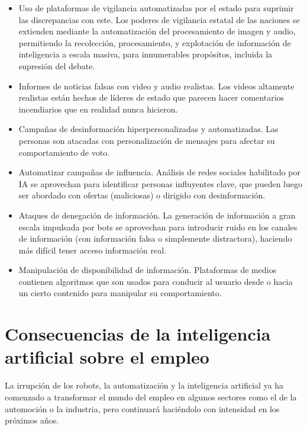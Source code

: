 \documentclass[12pt,a4paper]{article}
\begin{document}
\begin{itemize}

\item Uso de plataformas de vigilancia automatizadas por el estado para suprimir las discrepancias con este. Los poderes de vigilancia estatal de las naciones se extienden mediante la automatización del procesamiento de imagen y audio, permitiendo la recolección, procesamiento, y explotación de información de  inteligencia a escala masiva, para innumerables propósitos, incluida la supresión del debate.

\item Informes de noticias falsas con video y audio realistas. Los videos altamente realistas están hechos de líderes de estado que parecen hacer comentarios incendiarios que en realidad nunca hicieron.

\item Campañas de desinformación hiperpersonalizadas y automatizadas. Las personas son atacadas con personalización de mensajes para afectar su comportamiento de voto.

\item Automatizar campañas de influencia. Análisis de redes sociales habilitado por IA se aprovechan para identificar personas influyentes clave, que pueden luego ser abordado con ofertas (maliciosas) o dirigido con desinformación.

\item Ataques de denegación de información. La generación de información a gran escala impulsada por bots se aprovechan para introducir ruido en los canales de información (con información falsa o simplemente distractora), haciendo más difícil tener acceso información real.

\item Manipulación de disponibilidad de información. Plataformas de medios contienen algoritmos que son usados para conducir al usuario desde o hacia un cierto contenido para manipular su comportamiento.

\end{itemize}

\section{Consecuencias de la inteligencia artificial sobre el empleo}

La irrupción de los robots, la automatización y la inteligencia artificial ya ha comenzado a transformar el mundo del empleo en algunos sectores como el de la automoción o la industria, pero continuará haciéndolo con intensidad en los próximos años.
\end{document}
